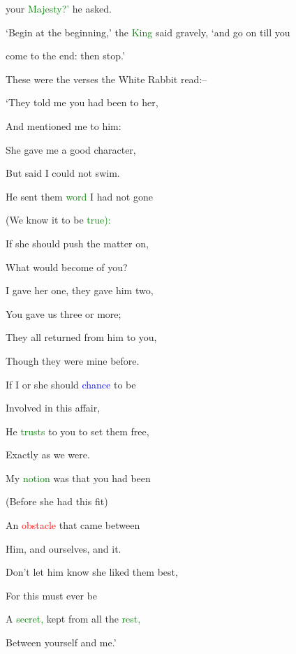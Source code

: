  your \textcolor{green}{Majesty?’} he asked.



 ‘Begin at the beginning,’ the \textcolor{green}{King} said gravely, ‘and go on till you

 come to the end: then stop.’



 These were the verses the \textcolor{BurntOrange}{White} Rabbit read:--



 ‘They told me you had been to her,

 And mentioned me to him:

 She gave me a \textcolor{BurntOrange}{good} character,

 But said I could not \textcolor{BurntOrange}{swim.}



 He sent them \textcolor{green}{word} I had not gone

 (We know it to be \textcolor{green}{true):}

 If she should push the matter on,

 What would become of you?



 I gave her one, they gave him two,

 You gave us three or more;

 They all returned from him to you,

 Though they were mine before.



 If I or she should \textcolor{blue}{chance} to be

 Involved in this affair,

 He \textcolor{green}{trusts} to you to set them free,

 Exactly as we were.



 My \textcolor{green}{notion} was that you had been

 (Before she had this fit)

 An \textcolor{red}{obstacle} that came between

 Him, and ourselves, and it.



 Don’t let him know she liked them best,

 For this must ever be

 A \textcolor{green}{secret,} kept from all the \textcolor{green}{rest,}

 Between yourself and me.’



